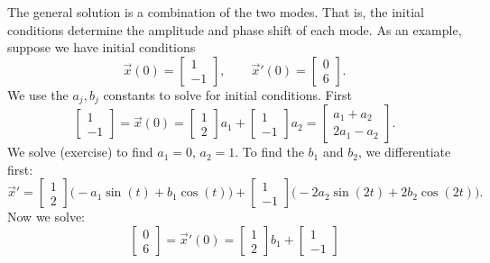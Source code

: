 \begin{example}
The general solution is a combination of the two modes.  That is, the
initial conditions determine the amplitude and phase shift of each mode.
As an example, suppose we have initial conditions
\begin{equation*}
\vec{x}(0) = 
\begin{bmatrix} 1 \\ -1 \end{bmatrix}
, \qquad
\vec{x}'(0) = 
\begin{bmatrix} 0 \\ 6 \end{bmatrix} .
\end{equation*}
We use the $a_j, b_j$ constants to solve for initial conditions.  First
\begin{equation*}
\begin{bmatrix} 1 \\ -1 \end{bmatrix}
=
\vec{x}(0) = 
\begin{bmatrix} 1 \\ 2 \end{bmatrix}
a_1
+
\begin{bmatrix} 1 \\ -1 \end{bmatrix}
a_2 
=
\begin{bmatrix} a_1+a_2 \\2a_1 - a_2 \end{bmatrix} .
\end{equation*}
We solve (exercise) to find $a_1 = 0$, $a_2 = 1$.
To find the $b_1$ and $b_2$, we differentiate first:
\begin{equation*}
{\vec{x}}' = 
\begin{bmatrix} 1 \\ 2 \end{bmatrix}
\bigl( - a_1 \sin (t) + b_1 \cos (t) \bigr)
+
\begin{bmatrix} 1 \\ -1 \end{bmatrix}
\bigl( - 2a_2 \sin (2t) + 2 b_2 \cos (2t) \bigr) .
\end{equation*}
Now we solve:
\begin{equation*}
\begin{bmatrix} 0 \\ 6 \end{bmatrix}
=
{\vec{x}}'(0) = 
\begin{bmatrix} 1 \\ 2 \end{bmatrix}
b_1
+
\begin{bmatrix} 1 \\ -1 \end{bmatrix}

\end{equation*}
\end{example}
